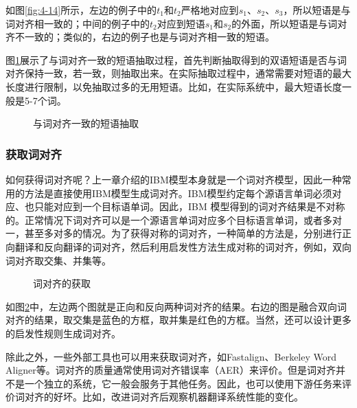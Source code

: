 \parinterval 如图\ref{fig:4-14}所示，左边的例子中的$t_1$和$t_2$严格地对应到$s_1$、$s_2$、$s_3$，所以短语是与词对齐相一致的；中间的例子中的$t_2$对应到短语$s_1$和$s_2$的外面，所以短语是与词对齐不一致的；类似的，右边的例子也是与词对齐相一致的短语。

\parinterval 图\ref{fig:4-15}展示了与词对齐一致的短语抽取过程，首先判断抽取得到的双语短语是否与词对齐保持一致，若一致，则抽取出来。在实际抽取过程中，通常需要对短语的最大长度进行限制，以免抽取过多的无用短语。比如，在实际系统中，最大短语长度一般是5-7个词。

\begin{figure}[htp]
\centering

\caption{与词对齐一致的短语抽取}
\label{fig:4-15}
\end{figure}


\subsubsection{获取词对齐}

\parinterval 如何获得词对齐呢？上一章介绍的IBM模型本身就是一个词对齐模型，因此一种常用的方法是直接使用IBM模型生成词对齐。IBM模型约定每个源语言单词必须对应、也只能对应到一个目标语单词。因此，IBM 模型得到的词对齐结果是不对称的。正常情况下词对齐可以是一个源语言单词对应多个目标语言单词，或者多对一，甚至多对多的情况。为了获得对称的词对齐，一种简单的方法是，分别进行正向翻译和反向翻译的词对齐，然后利用启发性方法生成对称的词对齐，例如，双向词对齐取交集、并集等。

\begin{figure}[htp]
\centering

\caption{词对齐的获取}
\label{fig:4-16}
\end{figure}

\parinterval 如图\ref{fig:4-16}中，左边两个图就是正向和反向两种词对齐的结果。右边的图是融合双向词对齐的结果，取交集是蓝色的方框，取并集是红色的方框。当然，还可以设计更多的启发性规则生成词对齐\cite{koehn2000estimating,koehn2007factored}。

\parinterval 除此之外，一些外部工具也可以用来获取词对齐，如Fastalign\cite{dyer2013a}、Berkeley Word Aligner\cite{taskar2005a}等。词对齐的质量通常使用词对齐错误率（AER）来评价\cite{DBLP:conf/coling/OchN00}。但是词对齐并不是一个独立的系统，它一般会服务于其他任务。因此，也可以使用下游任务来评价词对齐的好坏。比如，改进词对齐后观察机器翻译系统性能的变化。

